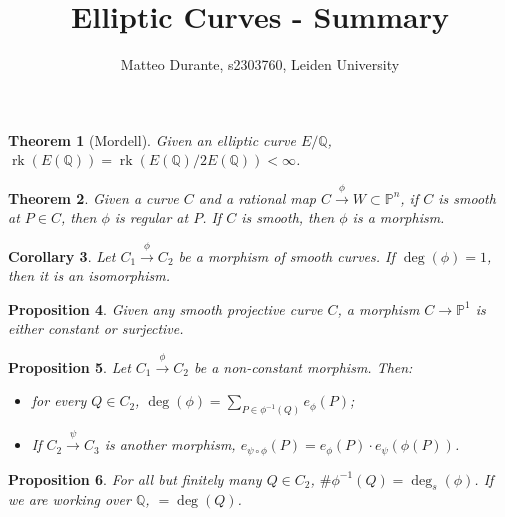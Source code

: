 \documentclass{article}
\newcommand{\numberset}{\mathbb}
\newcommand{\Q}{\numberset{Q}}
\newcommand{\Ps}{\mathbb{P}}
\DeclareMathOperator{\rk}{rk}
\theoremstyle{plain}
\newtheorem{thm}{Theorem}
\newtheorem{prop}[thm]{Proposition}
\newtheorem{cor}[thm]{Corollary}
\theoremstyle{definition}
\begin{document}
\title{Elliptic Curves - Summary}

\author{Matteo Durante, s2303760, Leiden University}

\maketitle

\begin{thm}[Mordell]
    Given an elliptic curve $E/\Q$, $\rk(E(\Q))=\rk(E(\Q)/2E(\Q))<\infty$.
\end{thm}

\begin{thm}
    Given a curve $C$ and a rational map $C\xrightarrow{\phi}W\subset\Ps^n$, if
    $C$ is smooth at $P\in C$, then $\phi$ is regular at $P$. If $C$ is smooth,
    then $\phi$ is a morphism.
\end{thm}

\begin{cor}
    Let $C_1\xrightarrow{\phi}C_2$ be a morphism of smooth curves. If
    $\deg(\phi)=1$, then it is an isomorphism.
\end{cor}

\begin{prop}
    Given any smooth projective curve $C$, a morphism $C\rightarrow\Ps^1$ is
    either constant or surjective.
\end{prop}

\begin{prop}
    Let $C_1\xrightarrow{\phi}C_2$ be a non-constant morphism. Then:
    \begin{itemize}
        \item for every $Q\in C_2$, $\deg(\phi)=\sum_{P\in\phi^{-1}(Q)}e_\phi(P)$;
        \item If $C_2\xrightarrow{\psi}C_3$ is another morphism,
            $e_{\psi\circ\phi}(P)=e_\phi(P)\cdot e_{\psi}(\phi(P))$.
    \end{itemize}
\end{prop}

\begin{prop}
    For all but finitely many $Q\in C_2$, $\#\phi^{-1}(Q)=\deg_s(\phi)$. If we
    are working over $\Q$, $=\deg(Q)$.
\end{prop}
\end{document}
